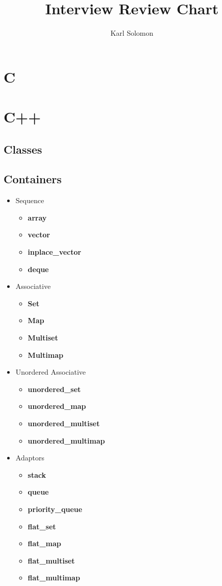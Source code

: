 \documentclass{article}
\begin{document}
\selectfont
\title{Interview Review Chart}
\author{Karl Solomon}
\maketitle
\section{C}
\section{C++}
\subsection{Classes}
\subsection{Containers}
\begin{itemize}
	\item Sequence
	      \begin{itemize}
		      \item \textbf{array}
		      \item \textbf{vector}
		      \item \textbf{inplace\_vector}
		      \item \textbf{deque}
	      \end{itemize}
	\item Associative
	      \begin{itemize}
		      \item \textbf{Set}
		      \item \textbf{Map}
		      \item \textbf{Multiset}
		      \item \textbf{Multimap}
	      \end{itemize}
	\item Unordered Associative
	      \begin{itemize}
		      \item \textbf{unordered\_set}
		      \item \textbf{unordered\_map}
		      \item \textbf{unordered\_multiset}
		      \item \textbf{unordered\_multimap}
	      \end{itemize}
	\item Adaptors
	      \begin{itemize}
		      \item \textbf{stack}
		      \item \textbf{queue}
		      \item \textbf{priority\_queue}
		      \item \textbf{flat\_set}
		      \item \textbf{flat\_map}
		      \item \textbf{flat\_multiset}
		      \item \textbf{flat\_multimap}
	      \end{itemize}
\end{itemize}
\end{document}
